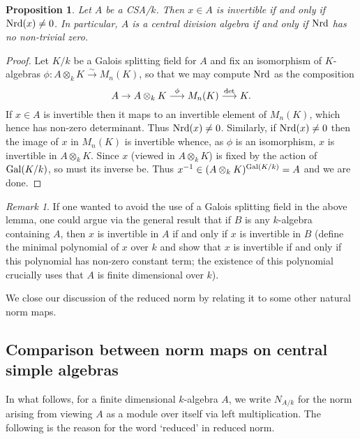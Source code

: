\documentclass[11pt]{amsart}
\numberwithin{equation}{section}
\newtheorem{proposition}[equation]{Proposition}
\theoremstyle{remark}
\newtheorem{remark}[equation]{Remark}
\theoremstyle{remark}
\theoremstyle{remark}
\theoremstyle{definition}
\theoremstyle{definition}
\theoremstyle{definition}
\theoremstyle{definition}
\theoremstyle{definition}
\theoremstyle{definition}
\begin{document}
\begin{proposition} \label{norm and division}
Let $A$ be a CSA/$k$. Then $x\in A$ is invertible if and only if $\textup{Nrd}(x)\neq 0$. In particular, $A$ is a central division algebra if and only if $\textup{Nrd}$ has no non-trivial zero. 
\end{proposition}

\begin{proof}
Let $K/k$ be a Galois splitting field for $A$ and fix an isomorphism of $K$-algebras $\phi:A\otimes_k K\stackrel{\sim}{\longrightarrow}M_n(K)$, so that we may compute $\textup{Nrd}$ as the composition 
\[A\rightarrow A\otimes_kK \stackrel{\phi}{\longrightarrow}M_n(K)\stackrel{\textup{det}}{\longrightarrow}K.\]
If $x\in A$ is invertible then it maps to an invertible element of $M_n(K)$, which hence has non-zero determinant. Thus $\textup{Nrd}(x)\neq 0$. Similarly, if $\textup{Nrd}(x)\neq 0$ then the image of $x$ in $M_n(K)$ is invertible whence, as $\phi$ is an isomorphism, $x$ is invertible in $A\otimes_k K$. Since $x$ (viewed in $A\otimes_k K$) is fixed by the action of $\textup{Gal}(K/k)$, so must its inverse be. Thus $x^{-1}\in (A\otimes_k K)^{\textup{Gal}(K/k)}=A$ and we are done.  
\end{proof}

\begin{remark}
If one wanted to avoid the use of a Galois splitting field in the above lemma, one could argue via the general result that if $B$ is any $k$-algebra containing $A$, then $x$ is invertible in $A$ if and only if $x$ is invertible in $B$ (define the minimal polynomial of $x$ over $k$ and show that $x$ is invertible if and only if this polynomial has non-zero constant term; the existence of this polynomial crucially uses that $A$ is finite dimensional over $k$). 
\end{remark}

We close our discussion of the reduced norm by relating it to some other natural norm maps. 



\subsection{Comparison between norm maps on central simple algebras}

In what follows, for a finite dimensional $k$-algebra $A$, we write $N_{A/k}$ for the norm arising from viewing $A$ as a module over itself via left multiplication. The following is the reason for the word `reduced' in reduced norm. 
\end{document}
